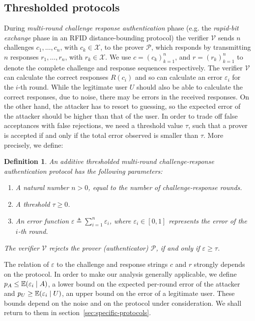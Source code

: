 \documentclass[a4paper]{article}
\newcommand \defn {\mathrel{\triangleq}}
\newcommand\E{\mathop{\mbox{\ensuremath{\mathbb{E}}}}\nolimits}
\newcommand \thr {\tau}
\newcommand \err {\varepsilon}
\newcommand \pa {p_A}
\newcommand \pu {p_U}
\newcommand \CX {\mathcal{X}}
\newcommand \auth {\mathcal{P}}
\newcommand \ver {\mathcal{V}}
\theoremstyle{plain} \newtheorem{remark}{Remark}
\theoremstyle{plain} \newtheorem{definition}{Definition}
\theoremstyle{plain} \newtheorem{example}{Example}
\theoremstyle{plain} \newtheorem{assumption}{Assumption}
\theoremstyle{plain} \newtheorem{conjecture}{Conjecture}
\theoremstyle{plain} \newtheorem{theorem}{Theorem}
\theoremstyle{plain} \newtheorem{proposition}{Proposition}
\theoremstyle{plain} \newtheorem{lemma}{Lemma}
\theoremstyle{plain} \newtheorem{corollary}{Corollary}
\begin{document}
\subsection{Thresholded protocols}
\label{sec:thresholded-protocols}
During {\em multi-round challenge response authentication} phase
(e.g. the \textit{rapid-bit exchange} phase in an RFID
distance-bounding protocol) the verifier $\ver$ sends $n$ challenges
$c_1, \ldots, c_n$, with $c_k \in \CX$, to the prover $\auth$, which
responds by transmitting $n$ responses $r_1, \ldots, r_n$, with $r_k
\in \CX$. We use $c = (c_k)_{k=1}^n$, and $r = (r_k)_{k=1}^n$ to
denote the complete challenge and response sequences respectively. The
verifier $\ver$ can calculate the correct responses $R(c_i)$ and so
can calculate an error $\err_i$ for the $i$-th round. While the
legitimate user $U$ should also be able to calculate the correct
responses, due to noise, there may be errors in the received
responses. On the other hand, the attacker has to resort to guessing,
so the expected error of the attacker should be higher than that of
the user.  In order to trade off false acceptances with false
rejections, we need a threshold value $\thr$, such that a prover is
accepted if and only if the total error observed is smaller than
$\thr$. More precisely, we define:
\begin{definition}
  An additive thresholded multi-round challenge-response
  authentication protocol has the following parameters:
  \begin{enumerate}
  \item A natural number $n > 0$, equal to the number of
    challenge-response rounds.
  \item A threshold $\thr \geq 0$.
  \item An error function $\err \defn \sum_{i=1}^n \err_{i}$, where
    $\err_{i} \in [0,1]$ represents the error of the $i$-th round.
  \end{enumerate}
  The verifier $\ver$ rejects the prover (authenticator) $\auth$,
  if and only if $\err \geq \thr$.
  \label{def:thresholded-auth}
\end{definition}
The relation of $\err$ to the challenge and response strings $c$ and
$r$ strongly depends on the protocol.  In order to make our analysis
generally applicable, we define $\pa \leq \E(\err_i \mid A)$, a lower
bound on the expected per-round error of the attacker and $\pu \geq
\E(\err_i \mid U)$, an upper bound on the error of a legitimate user.
These bounds depend on the noise and on the protocol under
consideration.  We shall return to them in
section~\ref{sec:specific-protocols}.
\end{document}

